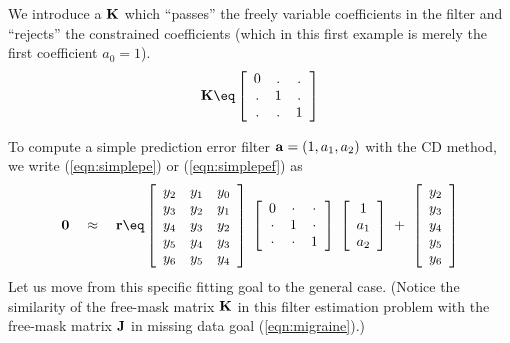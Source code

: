 \par
We introduce a
 $\bold K$
which ``passes'' the freely variable coefficients in the filter
and ``rejects'' the constrained coefficients
(which in this first example is merely the first coefficient $a_0=1$).
\begin{equation}
\bold K \eq
\left[
\begin{array}{cccccc}
  0   & .   & .    \\
  .   & 1   & .    \\
  .   & .   & 1    
  \end{array} \right]
\label{eqn:pefconstraint}
\end{equation}
\par
To compute a simple prediction error filter $\bold a =(1, a_1, a_2)$
with the CD method,
we write
(\ref{eqn:simplepe}) or
(\ref{eqn:simplepef}) as
\begin{equation}
\bold 0
\quad \approx \quad
\bold r \eq
\left[ 
\begin{array}{ccc}
  y_2 & y_1 & y_0 \\
  y_3 & y_2 & y_1  \\
  y_4 & y_3 & y_2  \\
  y_5 & y_4 & y_3  \\
  y_6 & y_5 & y_4  \end{array} \right] 
\;
\left[ 
\begin{array}{ccc}
    0   & \cdot & \cdot \\
  \cdot &   1   & \cdot \\
  \cdot & \cdot &   1   
  \end{array} \right] 
\;
\left[ 
\begin{array}{c}
  1 \\ 
  a_1 \\ 
  a_2 \end{array} \right]
  \ +\ 
\left[ 
\begin{array}{c}
  y_2 \\ 
  y_3 \\ 
  y_4 \\ 
  y_5 \\ 
  y_6 \end{array} \right] 
  \label{eqn:stdpef}
\end{equation}
Let us move from this specific fitting goal to the general case.
(Notice the similarity of the free-mask matrix $\bold K$
in this filter estimation problem with the
free-mask matrix $\bold J$ in missing data goal (\ref{eqn:migraine}).)
